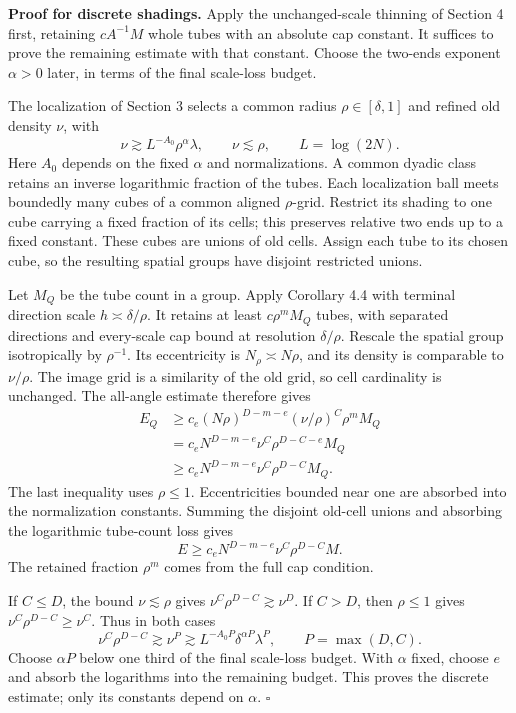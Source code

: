 \documentclass[
  11pt,
  a4paper,
]{article}
\begin{document}
\textbf{Proof for discrete shadings.} Apply the unchanged-scale thinning
of Section 4 first, retaining \(cA^{-1}M\) whole tubes with an absolute
cap constant. It suffices to prove the remaining estimate with that
constant. Choose the two-ends exponent \(\alpha>0\) later, in terms of
the final scale-loss budget.

The localization of Section 3 selects a common radius
\(\rho\in[\delta,1]\) and refined old density \(\nu\), with \[
 \nu\gtrsim L^{-A_0}\rho^\alpha\lambda,
 \qquad \nu\lesssim\rho,
 \qquad L=\log(2N).
\] Here \(A_0\) depends on the fixed \(\alpha\) and normalizations. A
common dyadic class retains an inverse logarithmic fraction of the
tubes. Each localization ball meets boundedly many cubes of a common
aligned \(\rho\)-grid. Restrict its shading to one cube carrying a fixed
fraction of its cells; this preserves relative two ends up to a fixed
constant. These cubes are unions of old cells. Assign each tube to its
chosen cube, so the resulting spatial groups have disjoint restricted
unions.

Let \(M_Q\) be the tube count in a group. Apply Corollary 4.4 with
terminal direction scale \(h\asymp\delta/\rho\). It retains at least
\(c\rho^mM_Q\) tubes, with separated directions and every-scale cap
bound at resolution \(\delta/\rho\). Rescale the spatial group
isotropically by \(\rho^{-1}\). Its eccentricity is
\(N_\rho\asymp N\rho\), and its density is comparable to \(\nu/\rho\).
The image grid is a similarity of the old grid, so cell cardinality is
unchanged. The all-angle estimate therefore gives \[
 \begin{aligned}
 E_Q
 &\ge c_e(N\rho)^{D-m-e}(\nu/\rho)^C\rho^mM_Q\\
 &=c_eN^{D-m-e}\nu^C\rho^{D-C-e}M_Q\\
 &\ge c_eN^{D-m-e}\nu^C\rho^{D-C}M_Q.
 \end{aligned}
\] The last inequality uses \(\rho\le1\). Eccentricities bounded near
one are absorbed into the normalization constants. Summing the disjoint
old-cell unions and absorbing the logarithmic tube-count loss gives \[
 E\ge c_eN^{D-m-e}\nu^C\rho^{D-C}M.                \tag{8.1}\label{eq:8.1}
\] The retained fraction \(\rho^m\) comes from the full cap condition.

If \(C\le D\), the bound \(\nu\lesssim\rho\) gives
\(\nu^C\rho^{D-C}\gtrsim\nu^D\). If \(C>D\), then \(\rho\le1\) gives
\(\nu^C\rho^{D-C}\ge\nu^C\). Thus in both cases \[
 \nu^C\rho^{D-C}\gtrsim\nu^P
 \gtrsim L^{-A_0P}\delta^{\alpha P}\lambda^P,
 \qquad P=\max(D,C).
\] Choose \(\alpha P\) below one third of the final scale-loss budget.
With \(\alpha\) fixed, choose \(e\) and absorb the logarithms into the
remaining budget. This proves the discrete estimate; only its constants
depend on \(\alpha\). \(\square\)
\end{document}
